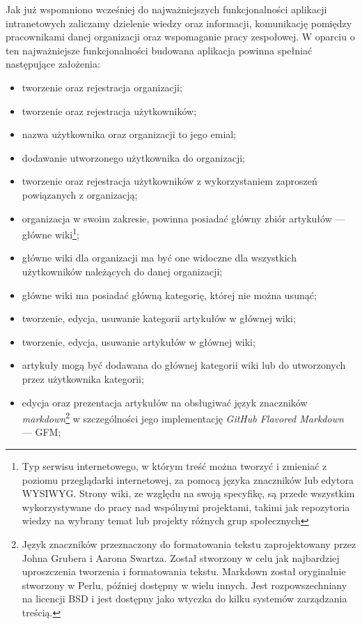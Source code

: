 Jak już wspomniono wcześniej do najważniejszych funkcjonalności aplikacji intranetowych zaliczamy dzielenie wiedzy oraz informacji, komunikację pomiędzy pracownikami danej organizacji oraz wspomaganie pracy zespołowej. W oparciu o ten najważniejsze funkcjonalności budowana aplikacja powinna spełniać następujące założenia:
\begin{itemize}
 \item tworzenie oraz rejestracja organizacji;
 \item tworzenie oraz rejestracja użytkowników;
 \item nazwa użytkownika oraz organizacji to jego emial;
 \item dodawanie utworzonego użytkownika do organizacji;
 \item tworzenie oraz rejestracja użytkowników z wykorzystaniem zaproszeń powiązanych z organizacją;
 \item organizacja w swoim zakresie, powinna posiadać główny zbiór artykułów --- główne wiki\footnote{Typ serwisu internetowego, w którym treść można tworzyć i zmieniać z poziomu przeglądarki internetowej, za pomocą języka znaczników lub edytora WYSIWYG. Strony wiki, ze względu na swoją specyfikę, są przede wszystkim wykorzystywane do pracy nad wspólnymi projektami, takimi jak repozytoria wiedzy na wybrany temat lub projekty różnych grup społecznych};
 \item główne wiki dla organizacji ma być one widoczne dla wszystkich użytkowników należących do danej organizacji; 
 \item główne wiki ma posiadać główną kategorię, której nie można usunąć;
 \item tworzenie, edycja, usuwanie kategorii artykułów w głównej wiki;
 \item tworzenie, edycja, usuwanie artykułów w głównej wiki; 
 \item artykuły mogą być dodawana do głównej kategorii wiki lub do utworzonych przez użytkownika kategorii;
 \item edycja oraz prezentacja artykułów na obsługiwać język znaczników \emph{markdown}\footnote{Język znaczników przeznaczony do formatowania tekstu zaprojektowany przez Johna Grubera i Aarona Swartza. Został stworzony w celu jak najbardziej uproszczenia tworzenia i formatowania tekstu. Markdown został oryginalnie stworzony w Perlu, później dostępny w wielu innych. Jest rozpowszechniany na licencji BSD i jest dostępny jako wtyczka do kilku systemów zarządzania treścią.} w szczególności jego implementację \textit{GitHub Flavored Markdown} --- GFM;

\end{itemize}
